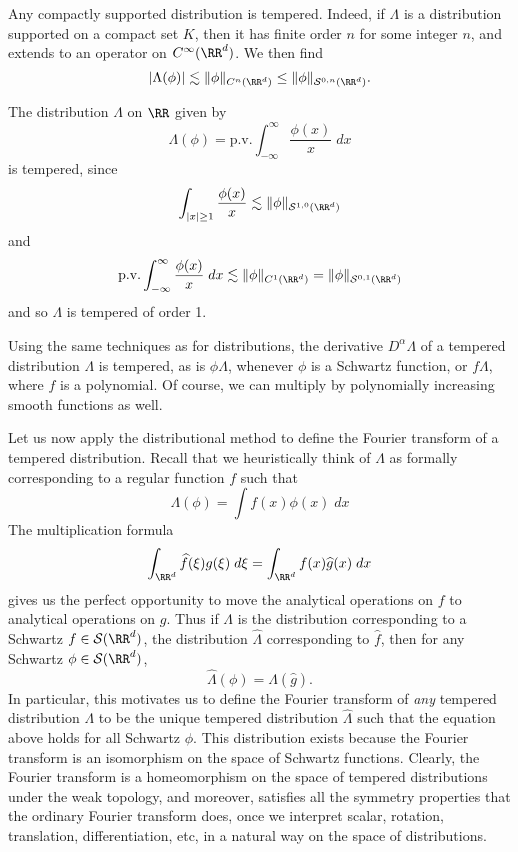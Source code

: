 \begin{example}
  Any compactly supported distribution is tempered. Indeed, if $\Lambda$ is a distribution supported on a compact set $K$, then it has finite order $n$ for some integer $n$, and extends to an operator on $C^\infty(\RR^d)$. We then find
  \[ |\Lambda(\phi)| \lesssim \| \phi \|_{C^n(\RR^d)} \leq \| \phi \|_{\mathcal{S}^{0,n}(\RR^d)}. \]
\end{example}

\begin{example}
  The distribution $\Lambda$ on $\RR$ given by
  \[ \Lambda(\phi) = \text{p.v.} \int_{-\infty}^\infty \frac{\phi(x)}{x}\; dx \]
  is tempered, since
  \[ \int_{|x| \geq 1} \frac{\phi(x)}{x} \lesssim \| \phi \|_{\mathcal{S}^{1,0}(\RR^d)} \]
  and
  \[ \text{p.v.} \int_{-\infty}^\infty \frac{\phi(x)}{x}\; dx \lesssim \| \phi \|_{C^1(\RR^d)} = \| \phi \|_{\mathcal{S}^{0,1}(\RR^d)} \]
  and so $\Lambda$ is tempered of order 1.
\end{example}

Using the same techniques as for distributions, the derivative $D^\alpha \Lambda$ of a tempered distribution $\Lambda$ is tempered, as is $\phi \Lambda$, whenever $\phi$ is a Schwartz function, or $f \Lambda$, where $f$ is a polynomial. Of course, we can multiply by polynomially increasing smooth functions as well.

Let us now apply the distributional method to define the Fourier transform of a tempered distribution. Recall that we heuristically think of $\Lambda$ as formally corresponding to a regular function $f$ such that
%
\[ \Lambda(\phi) = \int f(x) \phi(x)\; dx \]
%
The multiplication formula
%
\[ \int_{\RR^d} \widehat{f}(\xi) g(\xi)\; d\xi = \int_{\RR^d} f(x) \widehat{g}(x)\; dx \]
%
gives us the perfect opportunity to move the analytical operations on $f$ to analytical operations on $g$. Thus if $\Lambda$ is the distribution corresponding to a Schwartz $f \in \mathcal{S}(\RR^d)$, the distribution $\widehat{\Lambda}$ corresponding to $\widehat{f}$, then for any Schwartz $\phi \in \mathcal{S}(\RR^d)$,
%
\[ \widehat{\Lambda}(\phi) = \Lambda \left( \widehat{g} \right). \]
%
In particular, this motivates us to define the Fourier transform of \emph{any} tempered distribution $\Lambda$ to be the unique tempered distribution $\widehat{\Lambda}$ such that the equation above holds for all Schwartz $\phi$. This distribution exists because the Fourier transform is an isomorphism on the space of Schwartz functions. Clearly, the Fourier transform is a homeomorphism on the space of tempered distributions under the weak topology, and moreover, satisfies all the symmetry properties that the ordinary Fourier transform does, once we interpret scalar, rotation, translation, differentiation, etc, in a natural way on the space of distributions.

